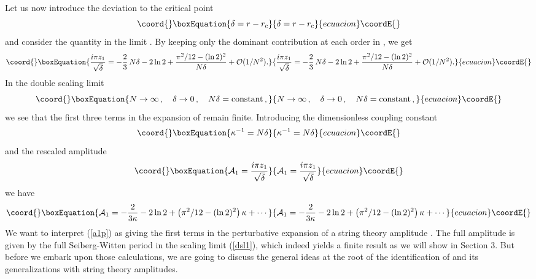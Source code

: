 \documentclass[a4paper,12pt]{article}
\def\rc{r_{\rm c}}\def\gc{g_{\rm c}}
\begin{document}
Let us now introduce the deviation to the critical point
%
\begin{equation}\coord{}\boxEquation{
\label{delta}
\delta = r-\rc
}{
\delta = r-\rc
}{ecuacion}\coordE{}\end{equation}
%
and consider the quantity \coordHE{} in the limit
\coordHE{}. By keeping only the dominant contribution
at each order in \coordHE{}, we get
%
\begin{equation}\coord{}\boxEquation{
\label{a1simple}
{i\pi z_1\over\sqrt{\delta}} = -{2\over 3}\, N\delta - 2\ln 2+ 
{\pi^2/12 - (\ln 2)^2\over N\delta} + {\cal O}(1/N^2).
}{
{i\pi z_1\over\sqrt{\delta}} = -{2\over 3}\, N\delta - 2\ln 2+ 
{\pi^2/12 - (\ln 2)^2\over N\delta} + {\cal O}(1/N^2).
}{ecuacion}\coordE{}\end{equation}
%
In the double scaling limit
%
\begin{equation}\coord{}\boxEquation{
\label{dsl1}
N\rightarrow\infty\, , \quad \delta\rightarrow 0\, ,\quad
N\delta = {\rm constant}\, ,
}{
N\rightarrow\infty\, , \quad \delta\rightarrow 0\, ,\quad
N\delta = {\rm constant}\, ,
}{ecuacion}\coordE{}\end{equation}
%
we see that the first three terms in the expansion of
\coordHE{} remain finite.
Introducing the dimensionless coupling constant
%
\begin{equation}\coord{}\boxEquation{
\label{kappadef}
\kappa ^{-1} = N\delta
}{
\kappa ^{-1} = N\delta
}{ecuacion}\coordE{}\end{equation}
%
and the rescaled amplitude
%
\begin{equation}\coord{}\boxEquation{
\label{a1def}
{\cal A}_1 = {i\pi z_1\over\sqrt{\delta}}
}{
{\cal A}_1 = {i\pi z_1\over\sqrt{\delta}}
}{ecuacion}\coordE{}\end{equation}
%
we have 
%
\begin{equation}\coord{}\boxEquation{
\label{a1p}
{\cal A}_1 = -{2\over 3\kappa} - 2\ln 2 + 
\left(\pi^2/12 - (\ln 2)^2\right) \kappa + \cdots
}{
{\cal A}_1 = -{2\over 3\kappa} - 2\ln 2 + 
\left(\pi^2/12 - (\ln 2)^2\right) \kappa + \cdots
}{ecuacion}\coordE{}\end{equation}
%
We want to interpret (\ref{a1p}) as giving the first terms in the
perturbative expansion of a string theory amplitude \coordHE{}. The
full amplitude is given by the full Seiberg-Witten period \coordHE{} in the scaling limit (\ref{dsl1}), which indeed yields
a finite result as we will show in Section 3. But before we embark upon 
those calculations, we are going to discuss the general ideas 
at the root of the identification of \coordHE{} and its
generalizations with string theory amplitudes.
\end{document}
